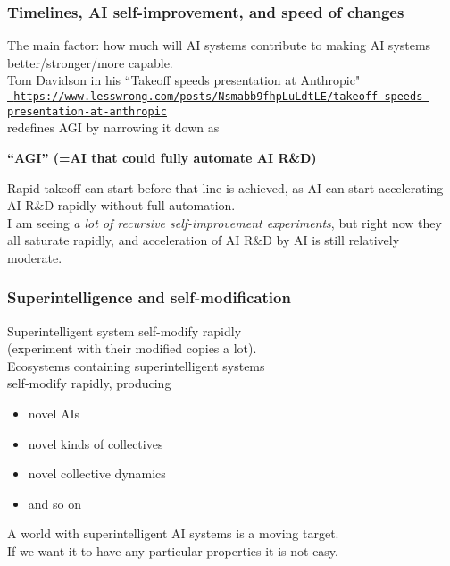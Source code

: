 \documentclass{beamer}
\newenvironment{customquote}
  {\begin{adjustwidth}{2em}{2em}\noindent\textnormal}
  {\end{adjustwidth}}
\newcommand{\msblue}[1]{{\color{myblue} #1}}
\begin{document}
\begin{frame}

  \frametitle{Timelines, AI self-improvement, and speed of changes}

The main factor: how much will AI systems contribute to making AI systems better/stronger/more capable.\\[2ex]

Tom Davidson in his ``Takeoff speeds presentation at Anthropic"\\[2ex] 

\href{https://www.lesswrong.com/posts/Nsmabb9fhpLuLdtLE/takeoff-speeds-presentation-at-anthropic}{\tt\tiny \msblue{https://www.lesswrong.com/posts/Nsmabb9fhpLuLdtLE/takeoff-speeds-presentation-at-anthropic}}\\[2ex]

redefines AGI by narrowing it down as\\[2ex]

\begin{customquote}
{\bf “AGI” (=AI that could fully automate AI R\&D)}\\[2ex]
\end{customquote}

Rapid takeoff can start before that line is achieved, as AI can start accelerating AI R\&D rapidly without full automation.\\[2ex]

I am seeing {\em a lot of recursive self-improvement experiments}, but right now they all saturate rapidly, and acceleration of
AI R\&D by AI is still relatively moderate. 

\end{frame}

\begin{frame}

  \frametitle{Superintelligence and self-modification}

Superintelligent system self-modify rapidly\\(experiment with their modified copies a lot).\\[2ex]

Ecosystems containing superintelligent systems\\self-modify rapidly, producing
\begin{itemize}
  \item novel AIs
  \item novel kinds of collectives
  \item novel collective dynamics
  \item and so on\\[2ex]
\end{itemize} 

A world with superintelligent AI systems is a moving target.\\[2ex]
If we want it to have any particular properties
it is not easy.

\end{frame}
\end{document}
